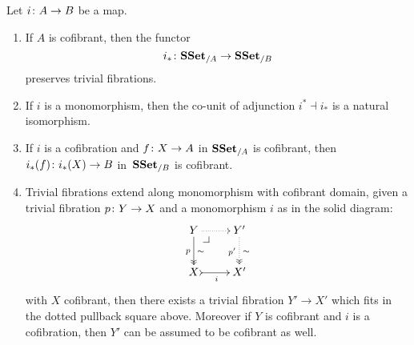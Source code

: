 \documentclass[reqno,10pt,a4paper,oneside,draft]{amsart}
\begin{document}
\begin{lemma}\label{Lemma:ForTheExtProperty} Let $i \colon A \rightarrow B$ be a map. 
\begin{enumerate}[$(i)$]
\item If $A$ is cofibrant, then the functor
\[ 
 i_* \colon \mathbf{SSet}_{/A} \rightarrow \mathbf{SSet}_{/B}  
 \]
preserves trivial fibrations.
\item If $i$ is a monomorphism, then the co-unit of adjunction $i^* \dashv i_*$ is a natural isomorphism.
\item If $i$ is a cofibration and $f \colon X \to A$ in $\mathbf{SSet}_{/A}$ is cofibrant, then $i_*(f) \colon i_*(X) \to B$ 
in~$\mathbf{SSet}_{/B}$ is cofibrant.
\item Trivial fibrations extend along monomorphism with cofibrant domain, \ie given a trivial fibration $p
 \colon Y \to X$ and a monomorphism $i$ as in the solid diagram:
\[
\xymatrix{
Y \ar@{.>}[r] \ar@{->>}[d]^{\sim}_{p} \drpullback  & Y' \ar@{.>>}[d]^{\sim}_{p'} \\
X \ar@{>->}[r]_i &  X' }
\]
with $X$ cofibrant, then there exists a trivial fibration $Y' \rightarrow X'$ which fits in the dotted pullback square above. Moreover if $Y$ is cofibrant and $i$ is a cofibration, then $Y'$ can be assumed to be 
cofibrant as well.
\end{enumerate}
\end{lemma}
\end{document}

